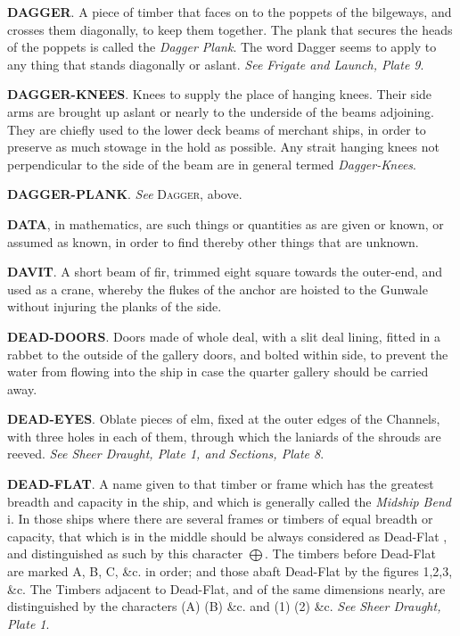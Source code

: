 \textbf{DAGGER}. A piece of timber that faces on to the poppets of the bilgeways, and crosses them diagonally, to keep them together. The plank that secures the heads of the poppets is called the \textit{Dagger Plank}. The word Dagger seems to apply to any thing that stands diagonally or aslant. \textit{See Frigate and Launch, Plate 9}. 

\textbf{DAGGER-KNEES}. Knees to supply the place of hanging knees. Their side arms are brought up aslant or nearly to the underside of the beams adjoining. They are chiefly used to the lower deck beams of merchant ships, in order to preserve as much stowage in the hold as possible. Any strait hanging knees not perpendicular to the side of the beam are in general termed \textit{Dagger-Knees}. 

\textbf{DAGGER-PLANK}. \textit{See} \textsc{Dagger}, above. 

\textbf{DATA}, in mathematics, are such things or quantities as are given or known, or assumed as known, in order to find thereby other things that are unknown. 

\textbf{DAVIT}. A short beam of fir, trimmed eight square towards the outer-end, and used as a crane, whereby the flukes of the anchor are hoisted to the Gunwale without injuring the planks of the side. 

\textbf{DEAD-DOORS}. Doors made of whole deal, with a slit deal lining, fitted in a rabbet to the outside of the gallery doors, and bolted within side, to prevent the water from flowing into the ship in case the quarter gallery should be carried away. 

\textbf{DEAD-EYES}. Oblate pieces of elm, fixed at the outer edges of the Channels, with three holes in each of them, through which the laniards of the shrouds are reeved. \textit{See Sheer Draught, Plate 1, and Sections, Plate 8}. 

\textbf{DEAD-FLAT}. A name given to that timber or frame which has the greatest breadth and capacity in the ship, and which is generally called the \textit{Midship Bend} i. In those ships where there are several frames or timbers of equal breadth or capacity, that which is in the middle should be always considered as Dead-Flat , and distinguished as such by this character $\bigoplus$. The timbers before Dead-Flat are marked A, B, C, \&c. in order; and those abaft Dead-Flat by the figures 1,2,3, \&c. The Timbers adjacent to Dead-Flat, and of the same dimensions nearly, are distinguished by the characters (A) (B) \&c. and (1) (2) \&c. \textit{See Sheer Draught, Plate 1}.

